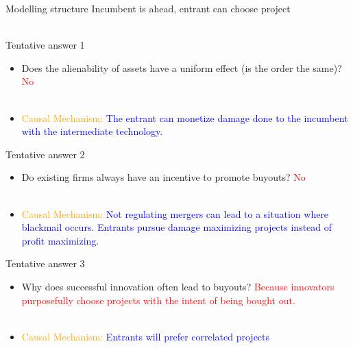 \documentclass{beamer}
\numberwithin{equation}{section}
\begin{document}
\begin{frame}{Modelling structure}
Incumbent is ahead, entrant can choose project \\~\\
\begin{center}
\end{center}

\end{frame}
\begin{frame}{Tentative answer 1}
\begin{itemize}
    \item Does the alienability of assets have a uniform effect (is the order the same)? \textcolor{red}{No} \\~\\
    \item \textcolor{orange}{Causal Mechanism:} \textcolor{blue}{The entrant can monetize damage done to the incumbent with the intermediate technology.}
\end{itemize}
\end{frame}
\begin{frame}{Tentative answer 2}
\begin{itemize}
    \item Do existing firms always have an incentive to promote buyouts? \textcolor{red}{No}\\~\\
    \item \textcolor{orange}{Causal Mechanism:} \textcolor{blue}{Not regulating mergers can lead to a situation where blackmail occurs. Entrants pursue damage maximizing projects instead of profit maximizing.}
\end{itemize}
\end{frame}
\begin{frame}{Tentative answer 3}
\begin{itemize}
    \item Why does successful innovation often lead to buyouts?\textcolor{red}{ Because innovators purposefully choose projects with the intent of being bought out.}\\~\\
    \item \textcolor{orange}{Causal Mechanism:} \textcolor{blue}{Entrants will prefer correlated projects}
\end{itemize}
\end{frame}
\end{document}
